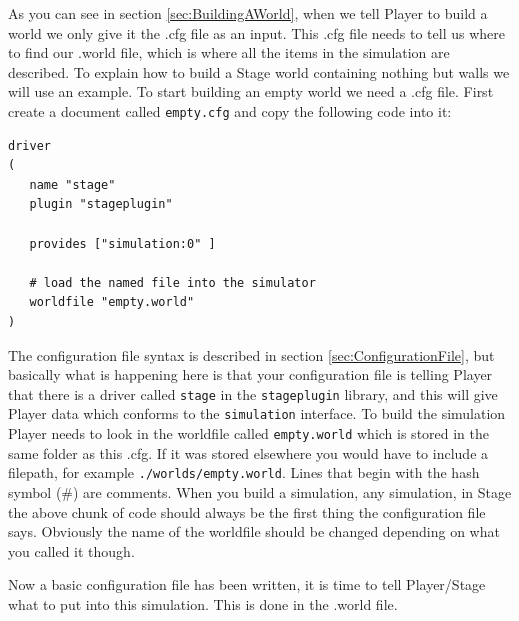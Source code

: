 \documentclass[a4paper]{report}
\newcommand{\plst}{Player/Stage\xspace}
\newcommand{\pl}{Player\xspace}
\begin{document}
As you can see in section \ref{sec:BuildingAWorld}, when we tell \pl to build a world we only give it the .cfg file as an input. This .cfg file needs to tell us where to find our .world file, which is where all the items in the simulation are described. To explain how to build a Stage world containing nothing but walls we will use an example.\newline
To start building an empty world we need a .cfg file. First create a document called \verb|empty.cfg| and copy the following code into it:
\begin{verbatim}
driver
(		
   name "stage"
   plugin "stageplugin"

   provides ["simulation:0" ]

   # load the named file into the simulator
   worldfile "empty.world"	
)
\end{verbatim}
The configuration file syntax is described in section \ref{sec:ConfigurationFile}, but basically what is happening here is that your configuration file is telling \pl that there is a driver called \verb|stage| in the \verb|stageplugin| library, and this will give \pl data which conforms to the \verb|simulation| interface. To build the simulation \pl needs to look in the worldfile called \verb|empty.world| which is stored in the same folder as this .cfg. If it was stored elsewhere you would have to include a filepath, for example \verb|./worlds/empty.world|. Lines that begin with the hash symbol (\#) are comments.
When you build a simulation, any simulation, in Stage the above chunk of code should always be the first thing the configuration file says. Obviously the name of the worldfile should be changed depending on what you called it though.

Now a basic configuration file has been written, it is time to tell \plst what to put into this simulation. This is done in the .world file. 
\end{document}
